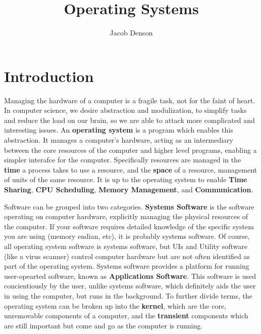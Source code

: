 

\title{Operating Systems}
\author{Jacob Denson}



\maketitle
\tableofcontents
{}

\chapter{Introduction}

Managing the hardware of a computer is a fragile task, not for the faint of heart. In computer science, we desire abstraction and modulization, to simplify tasks and reduce the load on our brain, so we are able to attack more complicated and interesting issues. An {\bf operating system} is a program which enables this abstraction. It manages a computer's hardware, acting as an intermediary between the core resources of the computer and higher level programs, enabling a simpler interafce for the computer. Specifically resources are managed in the {\bf time} a process takes to use a resource, and the {\bf space} of a resource, management of units of the same resource. It is up to the operating system to enable {\bf Time Sharing}, {\bf CPU Scheduling}, {\bf Memory Management}, and {\bf Communication}.

Software can be grouped into two categories. {\bf Systems Software} is the software operating on computer hardware, explicitly managing the physical resources of the computer. If your software requires detailed knowledge of the specific system you are using (memory endian, etc), it is probably systems software. Of course, all operating system software is systems software, but UIs and Utility software (like a virus scanner) control computer hardware but are not often identified as part of the operating system. Systems software provides a platform for running user-opearted software, known as {\bf Applications Software}. This software is used concientiously by the user, unlike systems software, which definitely aids the user in using the computer, but runs in the background. To further divide terms, the operating system can be broken up into the {\bf kernel}, which are the core, unremovable components of a computer, and the {\bf transient} components which are still important but come and go as the computer is running.

